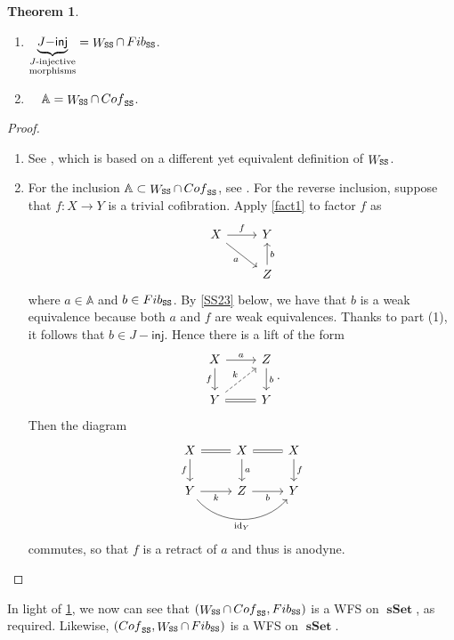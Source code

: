 \documentclass[10pt,letterpaper,cm]{nupset}
\theoremstyle{definition}
\theoremstyle{theorem}
\newtheorem{theorem}[definition]{Theorem}
\theoremstyle{remark}
\newcommand{\0}{\mathbf{0}}
\newcommand{\1}{\mathbf{1}}
\newcommand{\2}{\mathbf{2}}
\DeclareMathOperator{\sset}{\mathbf{sSet}}
\DeclareMathOperator{\idd}{id}
\DeclareMathOperator{\fib}{\mathnormal{Fib}}
\DeclareMathOperator{\cof}{\mathnormal{Cof}}
\DeclareMathOperator{\we}{\mathnormal{W}}
\newcommand{\be}{\begin{enumerate}}
\newcommand{\ee}{\end{enumerate}}
\begin{document}
\begin{theorem}\label{classseq} $ $
\be[label=(\arabic*)]
\item $\underbrace{J{-}\mathsf{inj}}_{\substack{\text{$J$-injective} \\ \text{morphisms}}}= \we_{\mathtt{SS}} \cap \fib_{\mathtt{SS}}$.
\item\ \ $\mathbb{A} = \we_{\mathtt{SS}} \cap \cof_{\mathtt{SS}}$.
\ee 
\end{theorem}
\pagebreak
\begin{proof} $ $
\be[label=(\arabic*)]
\item See \cite[Proposition 3.4.1]{Joyal}, which is based on a different yet equivalent definition of $\we_{\mathtt{SS}}$.
\item For the inclusion $\mathbb{A} \subset \we_{\mathtt{SS}} \cap \cof_{\mathtt{SS}}$, see \cite[Proposition 3.2.3]{Hovey}. For the reverse inclusion, suppose that $f : X \to  Y$ is a trivial cofibration. Apply \cref{fact1} to factor $f$ as
\[
\begin{tikzcd}
X \arrow[r, "f"] \arrow[rd, "a"'] & Y                 \\
                                  & Z \arrow[u, "b"']
\end{tikzcd}
\] where $a\in \mathbb{A}$ and $b\in \fib_{\mathtt{SS}}$. By \cref{SS23} below, we have that $b$ is a weak equivalence because both $a$ and $f$ are weak equivalences. Thanks to part (1), it follows that $b\in J{-}\mathsf{inj}$. Hence there is a lift of the form
\[
\begin{tikzcd}
X \arrow[r, "a"] \arrow[d, "f"']     & Z \arrow[d, "b"] \\
Y \arrow[r, equal] \arrow[ru, dashed, "k"] & Y               
\end{tikzcd}
.\] Then the diagram
\[
\begin{tikzcd}
X \arrow[r, equal] \arrow[d, "f"']                            & X \arrow[r, equal] \arrow[d, "a"] & X \arrow[d, "f"] \\
Y \arrow[r, "k"'] \arrow[rr, "\idd_Y"', bend right=49] & Z \arrow[r, "b"']          & Y               
\end{tikzcd}
\] commutes, so that $f$ is a retract of $a$ and thus is anodyne.
\ee
\end{proof}

\smallskip

In light of \cref{classseq}, we now can see that $\left(\we_{\mathtt{SS}} \cap \cof_{\mathtt{SS}}, \fib_{\mathtt{SS}}\right)$ is a WFS on $\sset$, as required. Likewise, $\left(\cof_{\mathtt{SS}}, \we_{\mathtt{SS}} \cap \fib_{\mathtt{SS}}\right)$ is a WFS on $\sset$.
\end{document}
